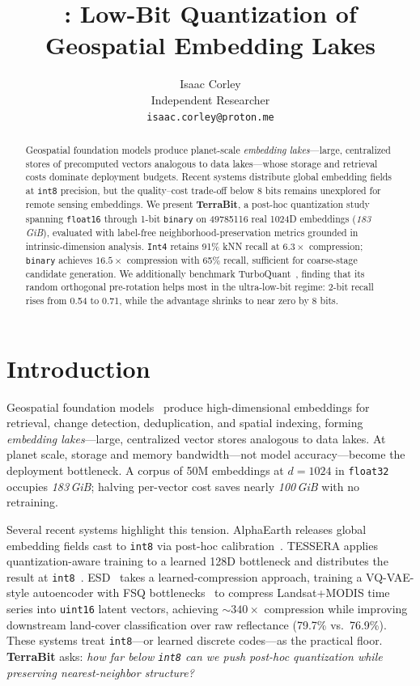 \documentclass{article}
\title{\method{}: Low-Bit Quantization of\\Geospatial Embedding Lakes \scalebox{2.0}{\twemoji{ocean}}}
\author{%
  Isaac Corley \\
  Independent Researcher \\
  \texttt{isaac.corley@proton.me} \\
}
\newcommand{\method}{\textbf{TerraBit}}
\begin{document}
\maketitle

\begin{abstract}
  Geospatial foundation models produce planet-scale \emph{embedding lakes}---large, centralized stores of precomputed vectors analogous to data lakes---whose storage and retrieval costs dominate deployment budgets.
  Recent systems distribute global embedding fields at \texttt{int8} precision, but the quality--cost trade-off below 8 bits remains unexplored for remote sensing embeddings.
  We present \method{}, a post-hoc quantization study spanning \texttt{float16} through 1-bit \texttt{binary} on \num{49785116} real 1024D embeddings (\textit{183\,GiB}), evaluated with label-free neighborhood-preservation metrics grounded in intrinsic-dimension analysis.
  \texttt{Int4} retains 91\% kNN recall at $6.3\times$ compression; \texttt{binary} achieves $16.5\times$ compression with 65\% recall, sufficient for coarse-stage candidate generation.
  We additionally benchmark TurboQuant~\citep{zandieh2025turboquant}, finding that its random orthogonal pre-rotation helps most in the ultra-low-bit regime: 2-bit recall rises from 0.54 to 0.71, while the advantage shrinks to near zero by 8 bits.
\end{abstract}

\section{Introduction}
\label{sec:intro}

Geospatial foundation models~\citep{mendieta2023gfm,jakubik2024prithvi,clay2025model} produce high-dimensional embeddings for retrieval, change detection, deduplication, and spatial indexing, forming \emph{embedding lakes}---large, centralized vector stores analogous to data lakes.
At planet scale, storage and memory bandwidth---not model accuracy---become the deployment bottleneck.
A corpus of 50M embeddings at $d{=}1024$ in \texttt{float32} occupies \textit{183\,GiB}; halving per-vector cost saves nearly \textit{100\,GiB} with no retraining.

Several recent systems highlight this tension.
AlphaEarth releases global embedding fields cast to \texttt{int8} via post-hoc calibration~\citep{brown2025alphaearth}.
TESSERA applies quantization-aware training to a learned 128D bottleneck and distributes the result at \texttt{int8}~\citep{feng2025tessera}.
ESD~\citep{chen2026esd} takes a learned-compression approach, training a VQ-VAE-style autoencoder with FSQ bottlenecks~\citep{mentzer2023fsq} to compress Landsat+MODIS time series into \texttt{uint16} latent vectors, achieving ${\sim}340\times$ compression while improving downstream land-cover classification over raw reflectance (79.7\% vs.\ 76.9\%).
These systems treat \texttt{int8}---or learned discrete codes---as the practical floor.
\method{} asks: \textit{how far below \texttt{int8} can we push post-hoc quantization while preserving nearest-neighbor structure?}
\end{document}
